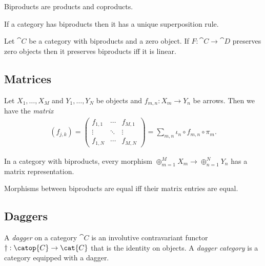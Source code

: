 \documentclass{article}
\begin{document}
\begin{lemma}
  Biproducts are products and coproducts.
\end{lemma}

\begin{lemma}
  If a category has biproducts then it has a unique superposition rule.
\end{lemma}

\begin{lemma}
  Let $\cat{C}$ be a category with biproducts and a zero object. If $F:\cat{C}\to\cat{D}$
  preserves zero objects then it preserves biproducts iff it is linear.
\end{lemma}

\subsection{Matrices}

\begin{definition}
  Let $X_1,\ldots,X_M$ and $Y_1,\ldots,Y_N$ be objects and $f_{m,n}:X_m\to Y_n$
  be arrows. Then we have the \emph{matrix}
  \begin{align*}
    (f_{j,k}) =
    \begin{pmatrix}
      f_{1,1} &\cdots & f_{M,1} \\
      \vdots &\ddots & \vdots \\
      f_{1,N} & \cdots & f_{M,N}
    \end{pmatrix}
    = \sum_{m,n} \iota_n \circ f_{m,n} \circ \pi_m.
  \end{align*}
\end{definition}

\begin{lemma}
  In a category with biproducts, every morphism $\oplus_{m=1}^M X_m \to \oplus_{n=1}^N Y_n$
  has a matrix representation.
\end{lemma}

\begin{corollary}
  Morphisms between biproducts are equal iff their matrix entries are equal.
\end{corollary}

\subsection{Daggers}

\begin{definition}
  A \emph{dagger} on a category $\cat{C}$ is an involutive contravariant functor
  $\dagger : \catop{C}\to\cat{C}$ that is the identity on objects. A \emph{dagger category}
  is a category equipped with a dagger.
\end{definition}
\end{document}
